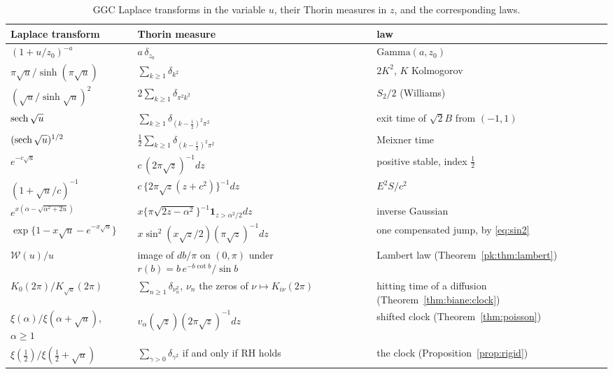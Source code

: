 \begin{table}[htbp]
\centering\small
\begin{tabular}{p{}p{}p{}}
\toprule
Laplace transform & Thorin measure & law\\
\midrule
$(1+u/z_0)^{-a}$ & $a\,\delta_{z_0}$ & $\mathrm{Gamma}(a,z_0)$\\
$\pi\sqrt u/\sinh(\pi\sqrt u)$ & $\sum_{k\ge1}\delta_{k^2}$ & $2K^2$, $K$ Kolmogorov\\
$(\sqrt u/\sinh\sqrt u)^2$ & $2\sum_{k\ge1}\delta_{\pi^2k^2}$ & $S_2/2$ (Williams)\\
$\operatorname{sech}\sqrt u$ & $\sum_{k\ge1}\delta_{(k-\frac12)^2\pi^2}$ & \raggedright exit time of $\sqrt2B$ from $(-1,1)$\tabularnewline
$(\operatorname{sech}\sqrt u)^{1/2}$ & $\frac12\sum_{k\ge1}\delta_{(k-\frac12)^2\pi^2}$ & Meixner time\\
$e^{-c\sqrt u}$ & $c\,(2\pi\sqrt z)^{-1}dz$ & positive stable, index $\frac12$\\
$(1+\sqrt u/c)^{-1}$ & $c\,\{2\pi\sqrt z(z+c^2)\}^{-1}dz$ & $E^2S/c^2$\\
$e^{x(\alpha-\sqrt{\alpha^2+2u})}$ & $x\{\pi\sqrt{2z-\alpha^2}\}^{-1}\mathbf 1_{z>\alpha^2/2}dz$ & inverse Gaussian\\
$\exp\{1-x\sqrt u-e^{-x\sqrt u}\}$ & $x\sin^2(x\sqrt z/2)(\pi\sqrt z)^{-1}dz$ & \raggedright one compensated jump, by \eqref{eq:sin2}\tabularnewline
$\mathcal W(u)/u$ & \raggedright image of $db/\pi$ on $(0,\pi)$ under $r(b)=b\,e^{-b\cot b}/\sin b$ & \raggedright Lambert law (Theorem~\ref{pk:thm:lambert})\tabularnewline
$K_0(2\pi)/K_{\sqrt u}(2\pi)$ & \raggedright $\sum_{n\ge1}\delta_{\nu_n^2}$, $\nu_n$ the zeros of $\nu\mapsto K_{i\nu}(2\pi)$ & \raggedright hitting time of a diffusion (Theorem~\ref{thm:biane:clock})\tabularnewline
$\xi(\alpha)/\xi(\alpha+\sqrt u)$, $\alpha\ge1$ & $v_\alpha(\sqrt z)(2\pi\sqrt z)^{-1}dz$ & \raggedright shifted clock (Theorem~\ref{thm:poisson})\tabularnewline
$\xi(\frac12)/\xi(\frac12+\sqrt u)$ & \raggedright $\sum_{\gamma>0}\delta_{\gamma^2}$ if and only if RH holds & \raggedright the clock (Proposition~\ref{prop:rigid})\tabularnewline
\bottomrule
\end{tabular}
\caption{GGC Laplace transforms in the variable $u$, their Thorin measures in $z$, and the corresponding laws.}
\label{tab:ch3:cat}
\end{table}


